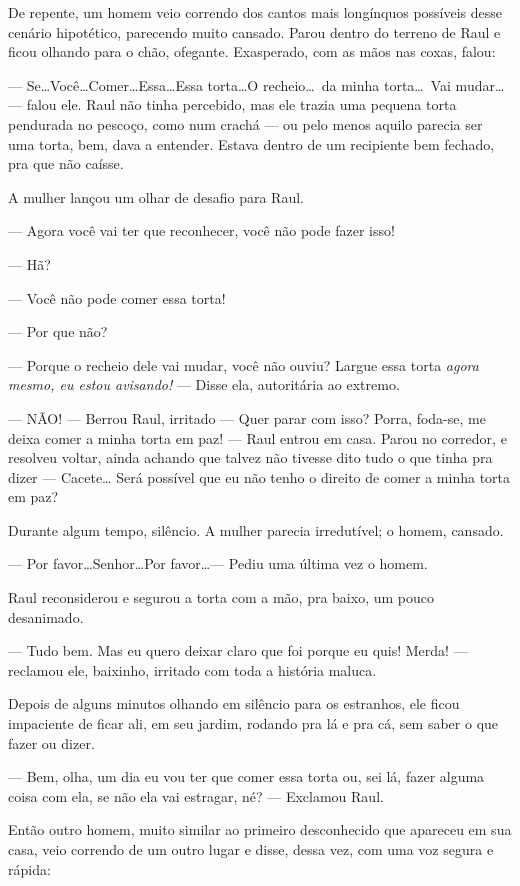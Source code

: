 De repente, um homem veio correndo dos cantos mais longínquos possíveis desse cenário hipotético, parecendo mui\-to cansado. Parou dentro do terreno de Raul e ficou olhando para o chão, ofegante. Exasperado, com as mãos nas coxas, falou:

--- Se\ldots Você\ldots Comer\ldots Essa\ldots Essa torta\ldots O recheio\ldots\ da minha torta\ldots \ Vai mudar\ldots --- falou ele. Raul não tinha percebido, mas ele trazia uma pequena torta pendurada no pescoço, como num crachá --- ou pelo menos aquilo parecia ser uma torta, bem, dava a entender. Estava dentro de um recipiente bem fechado, pra que não caísse.

A mulher lançou um olhar de desafio para Raul.

--- Agora você vai ter que reconhecer, você não pode fazer isso!

--- Hã?

--- Você não pode comer essa torta!

--- Por que não?

--- Porque o recheio dele vai mudar, você não ouviu? Largue essa torta \emph{agora mesmo, eu estou avisando!} --- Disse ela, autoritária ao extremo.

--- NÃO! --- Berrou Raul, irritado --- Quer parar com isso? Porra, foda-se, me deixa comer a minha torta em paz! --- Raul entrou em casa. Parou no corredor, e resolveu voltar, ainda achando que talvez não tivesse dito tudo o que tinha pra dizer --- Cacete… Será possível que eu não tenho o direito de comer a minha torta em paz?

Durante algum tempo, silêncio. A mulher parecia irredutível; o homem, cansado.

--- Por favor\ldots Senhor\ldots Por favor\ldots --- Pediu uma última vez o homem.

Raul reconsiderou e segurou a torta com a mão, pra baixo, um pouco desanimado.

--- Tudo bem. Mas eu quero deixar claro que foi porque eu quis! Merda! --- reclamou ele, baixinho, irritado com toda a história maluca.

Depois de alguns minutos olhando em silêncio para os estranhos, ele ficou impaciente de ficar ali, em seu jardim, rodando pra lá e pra cá, sem saber o que fazer ou dizer.

--- Bem, olha, um dia eu vou ter que comer essa torta ou, sei lá, fazer alguma coisa com ela, se não ela vai estragar, né? --- Exclamou Raul.

Então outro homem, muito similar ao primeiro desconhecido que apareceu em sua casa, veio correndo de um outro lugar e disse, dessa vez, com uma voz segura e rápida:

